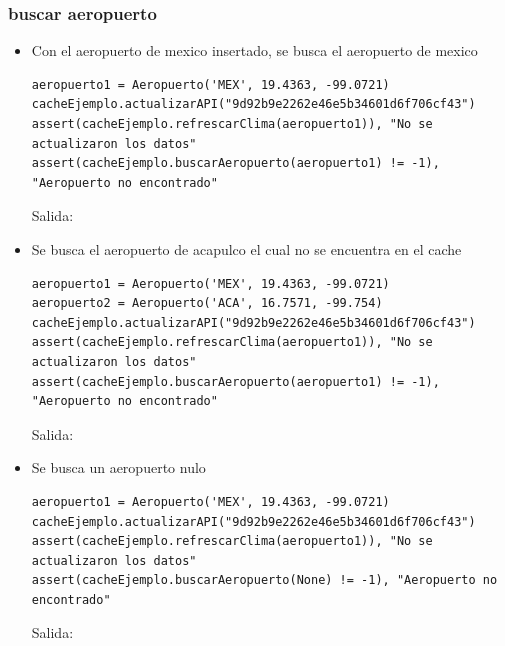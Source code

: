 \documentclass[12pt]{article}
\begin{document}
\subsubsection{buscar aeropuerto}
\begin{itemize}
\item Con el aeropuerto de mexico insertado, se busca el aeropuerto de mexico
\begin{verbatim}
aeropuerto1 = Aeropuerto('MEX', 19.4363, -99.0721)
cacheEjemplo.actualizarAPI("9d92b9e2262e46e5b34601d6f706cf43")
assert(cacheEjemplo.refrescarClima(aeropuerto1)), "No se actualizaron los datos"
assert(cacheEjemplo.buscarAeropuerto(aeropuerto1) != -1), "Aeropuerto no encontrado"
\end{verbatim}
  Salida:
\item Se busca el aeropuerto de acapulco el cual no se encuentra en el cache
\begin{verbatim}
aeropuerto1 = Aeropuerto('MEX', 19.4363, -99.0721)
aeropuerto2 = Aeropuerto('ACA', 16.7571, -99.754)
cacheEjemplo.actualizarAPI("9d92b9e2262e46e5b34601d6f706cf43")
assert(cacheEjemplo.refrescarClima(aeropuerto1)), "No se actualizaron los datos"
assert(cacheEjemplo.buscarAeropuerto(aeropuerto1) != -1), "Aeropuerto no encontrado"
\end{verbatim}
  Salida:
\item Se busca un aeropuerto nulo
\begin{verbatim}
aeropuerto1 = Aeropuerto('MEX', 19.4363, -99.0721)
cacheEjemplo.actualizarAPI("9d92b9e2262e46e5b34601d6f706cf43")
assert(cacheEjemplo.refrescarClima(aeropuerto1)), "No se actualizaron los datos"
assert(cacheEjemplo.buscarAeropuerto(None) != -1), "Aeropuerto no encontrado"
\end{verbatim}
  Salida:
\end{itemize}
\end{document}
